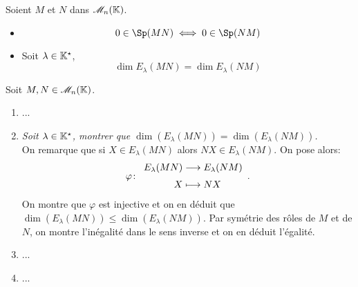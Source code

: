 \begin{prop}
    Soient $M$ et $N$ dans $\mathscr{M}_n(\mathbb{K})$.
    \begin{itemize}
        \item $$0 \in \Sp(MN) \iff 0 \in \Sp(NM)$$
        \item Soit $\lambda \in \mathbb{K}^\star$,
        $$\dim E_\lambda(MN) = \dim E_\lambda(NM)$$
    \end{itemize}
\end{prop}

Soit $M, N \in \mathscr{M}_n(\mathbb{K})$. 
\begin{enumerate}
    \item ...
    \item \emph{Soit $\lambda \in \mathbb{K}^\star$, montrer que $\dim(E_\lambda (MN)) = \dim(E_\lambda (NM))$.} \\
    On remarque que si $X \in E_\lambda (MN)$ alors $NX \in E_\lambda (NM)$. On pose alors:
    $$
        \fonction[\varphi]{E_\lambda (MN)}{E_\lambda (NM)}{X}{NX}.
    $$
    On montre que $\varphi$ est injective et on en déduit que $\dim(E_\lambda (MN)) \leqslant \dim(E_\lambda (NM))$. Par symétrie des rôles de $M$ et de $N$, on montre l'inégalité dans le sens inverse et on en déduit l'égalité.
    \item ...
    \item ...
\end{enumerate}
